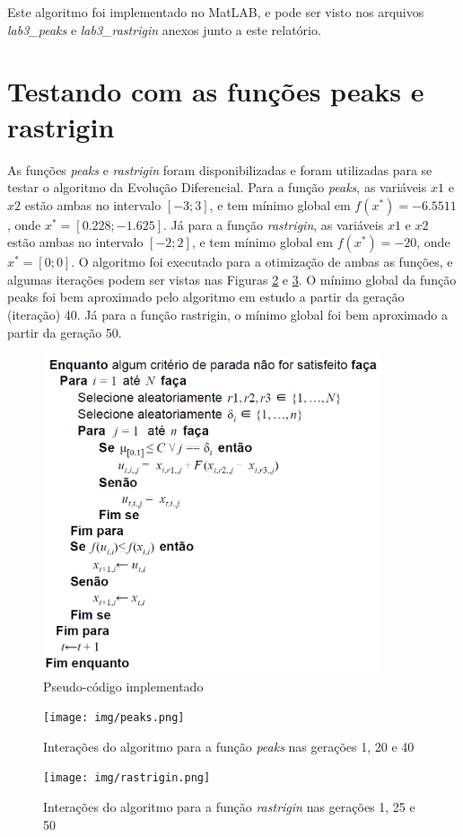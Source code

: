\documentclass[12pt]{elsarticle}
\begin{document}
	Este algoritmo foi implementado no MatLAB, e pode ser visto nos arquivos \textit{lab3\_peaks} e \textit{lab3\_rastrigin} anexos junto a este relatório.
	
	\section{Testando com as funções peaks e rastrigin}
	As funções \textit{peaks} e \textit{rastrigin} foram disponibilizadas e foram utilizadas para se testar o algoritmo da Evolução Diferencial. Para a função \textit{peaks}, as variáveis $x1$ e $x2$ estão ambas no intervalo $[-3; 3]$, e tem mínimo global em $f(x^*) = -6.5511$, onde $x^* = [0.228; -1.625]$. Já para a função \textit{rastrigin}, as variáveis $x1$ e $x2$ estão ambas no intervalo $[-2; 2]$, e tem mínimo global em $f(x^*) = -20$, onde $x^* = [0; 0]$. O algoritmo foi executado para a otimização de ambas as funções, e algumas iterações podem ser vistas nas Figuras \ref{fig:peaks} e \ref{fig:rastrigin}. O mínimo global da função peaks foi bem aproximado pelo algoritmo em estudo a partir da geração (iteração) 40. Já para a função rastrigin, o mínimo global foi bem aproximado a partir da geração 50.
	
	\pagebreak
	\begin{figure}[h]
		\centering
		\includegraphics[width=10cm]{img/pseudo-code.png}
		\caption{Pseudo-código implementado}
		\label{fig:pseudo-code}
	\end{figure}
	\begin{figure}[h]
		\centering
		\texttt{[image: img/peaks.png]}
		\caption{Interações do algoritmo para a função \textit{peaks} nas gerações 1, 20 e 40}
		\label{fig:peaks}
	\end{figure}
	\begin{figure}[h]
		\centering
		\texttt{[image: img/rastrigin.png]}
		\caption{Interações do algoritmo para a função \textit{rastrigin} nas gerações 1, 25 e 50}
		\label{fig:rastrigin}
	\end{figure}
	
\end{document}
